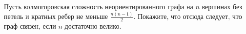 Пусть колмогоровская сложность неориентированного графа на $n$ вершинах без петель и кратных ребер не
меньше $\frac{n (n - 1)}{2}$. Покажите, что отсюда следует, что граф связен, если $n$ достаточно велико.

